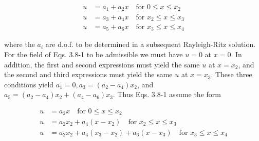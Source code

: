 \documentclass[10pt]{article}
\begin{document}
\begin{align*}
u&=a_{1}+a_{2} x \quad \text{for } 0 \leqslant x \leqslant x_{2} \\
u&=a_{3}+a_{4} x \quad \text{for } x_{2} \leqslant x \leqslant x_{3} \\
u&=a_{5}+a_{6} x \quad \text{for } x_{3} \leqslant x \leqslant x_{4} \tag{3.8-1c}
\end{align*}

where the $a_{i}$ are d.o.f. to be determined in a subsequent Rayleigh-Ritz solution. For the field of Eqs. 3.8-1 to be admissible we must have $u=0$ at $x=0$. In addition, the first and second expressions must yield the same $u$ at $x=x_{2}$, and the second and third expressions must yield the same $u$ at $x=x_{3}$. These three conditions yield $a_{1}=0, a_{3}=\left(a_{2}-a_{4}\right) x_{2}$, and $a_{5}=\left(a_{2}-a_{4}\right) x_{2}+\left(a_{4}-a_{6}\right) x_{3}$. Thus Eqs. 3.8-1 assume the form

\begin{align*}
u &= a_{2} x \quad \text{for } 0 \leqslant x \leqslant x_{2} \\
u &= a_{2} x_{2}+a_{4}\left(x-x_{2}\right) \quad \text{for } x_{2} \leqslant x \leqslant x_{3} \\
u &= a_{2} x_{2}+a_{4}\left(x_{3}-x_{2}\right)+a_{6}\left(x-x_{3}\right) \quad \text{for } x_{3} \leqslant x \leqslant x_{4} \tag{3.8-2}
\end{align*}
\end{document}
